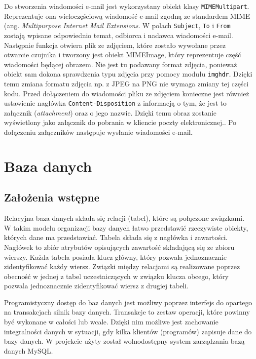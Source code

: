 \documentclass[a4paper,12pt,twoside]{article}
\begin{document}
Do stworzenia wiadomości e-mail jest wykorzystany obiekt klasy \texttt{MIMEMultipart}. Reprezentuje ona wieloczęściową wiadomość e-mail zgodną ze standardem MIME (ang. \textit{Multipurpose Internet Mail Extensions}\cite{mime1}\cite{mime2}.  W polach \texttt{Subject}, \texttt{To} i \texttt{From} zostają wpisane odpowiednio temat, odbiorca i nadawca wiadomości e-mail. Następnie funkcja otwiera plik ze zdjęciem, które zostało wywołane przez otwarcie czujnika i tworzony jest obiekt MIMEImage, który reprezentuje część wiadomości będącej obrazem. Nie jest tu podawany format zdjęcia, ponieważ obiekt sam dokona sprawdzenia typu zdjęcia przy pomocy modułu \texttt{imghdr}\cite{python-mime}. Dzięki temu zmiana formatu zdjęcia np. z JPEG na PNG nie wymaga zmiany tej części kodu. Przed dołączeniem do wiadomości pliku ze zdjęciem konieczne jest również ustawienie nagłówka \texttt{Content-Disposition} z informacją o tym, że jest to załącznik (\textit{attachment}) oraz o jego nazwie. Dzięki temu obraz zostanie wyświetlony jako załącznik do pobrania w kliencie poczty elektronicznej.\cite{content-disposition}. Po dołączeniu załączników następuje wysłanie wiadomości e-mail.
\newpage

\section{Baza danych}
\subsection{Założenia wstępne}
Relacyjna baza danych składa się relacji (tabel), które są połączone związkami. W takim modelu organizacji bazy danych łatwo przedstawić rzeczywiste obiekty, których dane ma przedstawiać. Tabela składa się z nagłówka i zawartości. Nagłówek to zbiór atrybutów opisujących zawartość składającą się ze zbioru wierszy. Każda tabela posiada klucz główny, który pozwala jednoznacznie zidentyfikować każdy wiersz. Związki między relacjami są realizowane poprzez obecność w jednej z tabel uczestniczących w związku klucza obcego, który pozwala jednoznacznie zidentyfikować wiersz z drugiej tabeli.

Programistyczny dostęp do baz danych jest możliwy poprzez interfejs do opartego na transakcjach silnik bazy danych. Transakcje to zestaw operacji, które powinny być wykonane w całości lub wcale. Dzięki nim możliwe jest zachowanie integralności danych w sytuacji, gdy kilka klientów (programów) zapisuje dane do bazy danych. W projekcie użyty został wolnodostępny system zarządzania bazą danych MySQL.
\end{document}
